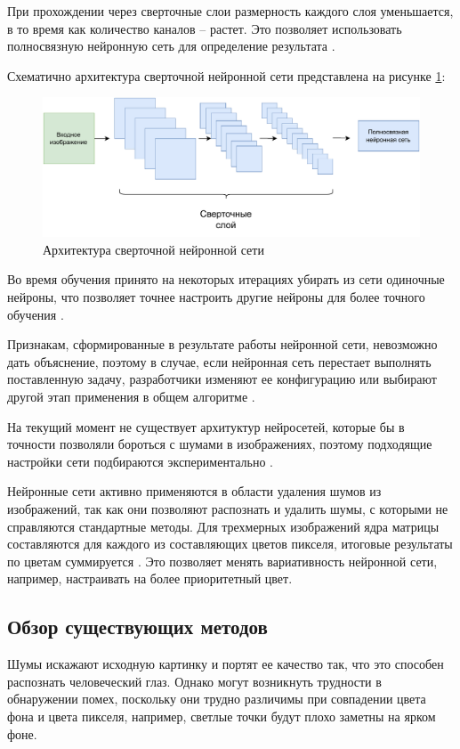 При прохождении через сверточные слои размерность каждого слоя уменьшается, в то время как количество каналов -- растет.
Это позволяет использовать полносвязную нейронную сеть для определение результата \cite{CNN_arch}.

Схематично архитектура сверточной нейронной сети представлена на рисунке \ref{analit::CNN}:
\FloatBarrier
\begin{figure}[h]	
	\begin{center}
		\includegraphics[width=\linewidth]{inc/pdf/CNN.pdf}
	\end{center}
	\captionsetup{justification=centering}
	\caption{Архитектура сверточной нейронной сети}
	\label{analit::CNN}
\end{figure}
\FloatBarrier

Во время обучения принято на некоторых итерациях убирать из сети одиночные нейроны, что позволяет точнее настроить другие нейроны для более точного обучения \cite{ridnet}.

Признакам, сформированные в результате работы нейронной сети, невозможно дать объяснение, поэтому в случае, если нейронная сеть перестает выполнять поставленную задачу, разработчики изменяют ее конфигурацию или выбирают другой этап применения в общем алгоритме \cite{CNN_2}. 

На текущий момент не существует архитуктур нейросетей, которые бы в точности позволяли бороться с шумами в изображениях, поэтому подходящие настройки сети подбираются экспериментально \cite{neural}.

Нейронные сети активно применяются в области удаления шумов из изображений, так как они позволяют распознать и удалить шумы, с которыми не справляются стандартные методы.
Для трехмерных изображений ядра матрицы составляются для каждого из составляющих цветов пикселя, итоговые результаты по цветам суммируется \cite{ridnet}. 
Это позволяет менять вариативность нейронной сети, например, настраивать на более приоритетный цвет.

\subsection{Обзор существующих методов}
Шумы искажают исходную картинку и портят ее качество так, что это способен распознать человеческий глаз.
Однако могут возникнуть трудности в обнаружении помех, поскольку они трудно различимы при совпадении цвета фона и цвета пикселя, например, светлые точки будут плохо заметны на ярком фоне.

